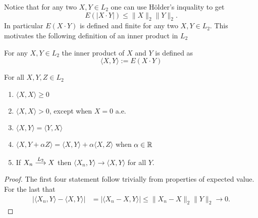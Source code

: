 Notice that for any two $X, Y \in L_2$ one can use H\"older's inquality  to get
\begin{equation}
\label{cw}
 E(|X\cdot Y|) \leq \| X\|_2 \|Y\|_2.
 \end{equation}
In particular $E(X\cdot Y)$ is defined and finite for any two $X, Y \in L_2$. This motivates the following definition of an inner product in $L_2$

\begin{definition}
For any $X, Y \in L_2$ the inner product of $X$ and $Y$ is defined as
\begin{equation}
\label{inner product def}
\langle X, Y\rangle := E(X\cdot Y)
\end{equation}
\end{definition}

\begin{theorem}
\label{basic inner product properties}
For all $X, Y, Z\in L_2$
\begin{enumerate}
\item $\langle X,X\rangle \geq 0$
\item $\langle X,X\rangle > 0$, except when $X = 0$ a.e.
\item $\langle X,Y\rangle= \langle Y,X\rangle $
\item $\langle X, Y + \alpha Z \rangle= \langle X, Y \rangle + \alpha\langle X, Z \rangle$ when $\alpha\in \Bbb R$
\item \label{weak limits} If $X_n \overset{\small L_2} \longrightarrow X$ then $\langle X_n, Y \rangle \rightarrow \langle X, Y\rangle$ for all $Y$.
\end{enumerate}
\end{theorem}
\begin{proof} The first four statement follow trivially from properties of expected value. For the last that
\begin{align*}
|\langle X_n, Y\rangle - \langle X,Y\rangle| &= |\langle X_n - X, Y\rangle|
\leq \| X_n - X\|_2 \|Y\|_2 \rightarrow 0.
\end{align*}
\end{proof}


